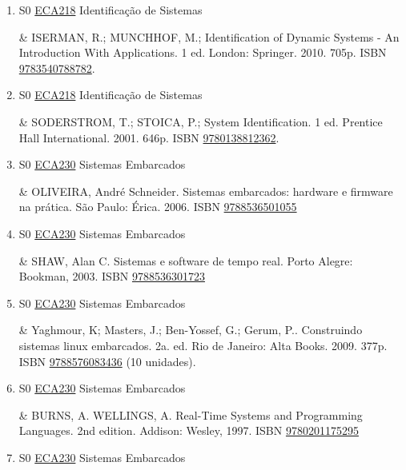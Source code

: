 \documentclass[12pt,a4paper]{book}
\begin{document}
\begin{enumerate}
 \item S0 \hyperref[PUD:ECA218]{ECA218} Identificação de Sistemas

&  ISERMAN, R.;  MUNCHHOF, M.;  Identification of Dynamic Systems - An Introduction With Applications.  1 ed.   London: Springer.  2010.  705p.  ISBN \href{http://www.google.com/search?hl=pt-BR&tbo=p&tbm=bks&q=isbn:9783540788782&num=10}{9783540788782}.  
 

 \item S0 \hyperref[PUD:ECA218]{ECA218} Identificação de Sistemas

&  SODERSTROM, T.;  STOICA, P.;  System Identification.  1 ed.  Prentice Hall International.  2001.  646p.  ISBN \href{http://www.isbnsearch.org/isbn/9780138812362}{9780138812362}.
 \item S0 \hyperref[PUD:ECA230]{ECA230} Sistemas Embarcados

&  OLIVEIRA, André Schneider.  Sistemas embarcados: hardware e firmware na prática.  São Paulo: Érica.  2006.  ISBN \href{http://www.bn.br/site/pages/servicosProfissionais/agenciaISBN/isbnBusca/FbnBuscaISBNCatalogo.asp?pField=ISBN&pIntPagina=1&pISBN=36501055&nidbISBN=true&hidbISBN=true}{9788536501055}
 

 \item S0 \hyperref[PUD:ECA230]{ECA230} Sistemas Embarcados

&  SHAW, Alan C.  Sistemas e software de tempo real.  Porto Alegre: Bookman, 2003.  ISBN \href{http://www.bn.br/site/pages/servicosProfissionais/agenciaISBN/isbnBusca/FbnBuscaISBNCatalogo.asp?pField=ISBN&pIntPagina=1&pISBN=36301723&nidbISBN=true&hidbISBN=true}{9788536301723}
 

 \item S0 \hyperref[PUD:ECA230]{ECA230} Sistemas Embarcados

& Yaghmour, K;  Masters, J.;  Ben-Yossef, G.;  Gerum, P..  Construindo sistemas linux embarcados.  2a.  ed.  Rio de Janeiro: Alta Books.  2009.  377p.  ISBN \href{http://www.bn.br/site/pages/servicosProfissionais/agenciaISBN/isbnBusca/FbnBuscaISBNCatalogo.asp?pField=ISBN&pIntPagina=1&pISBN=76083436&nidbISBN=true&hidbISBN=true}{9788576083436} (10 unidades).
 \item S0 \hyperref[PUD:ECA230]{ECA230} Sistemas Embarcados

&  BURNS, A.  WELLINGS, A.  Real-Time Systems and Programming Languages.  2nd edition.  Addison: Wesley, 1997.  ISBN \href{http://www.isbnsearch.org/isbn/9780201175295}{9780201175295}
 

 \item S0 \hyperref[PUD:ECA230]{ECA230} Sistemas Embarcados


\end{enumerate}
\end{document}
